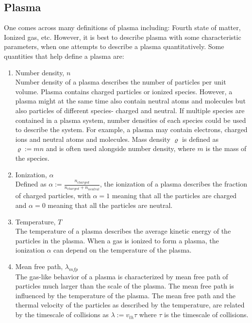 \documentclass[12pt]{article}
\begin{document}
	\subsection{Plasma}
	One comes across many definitions of plasma including: Fourth state of matter, Ionized gas, etc. However, it is best to describe plasma with some characteristic parameters, when one attempts to describe a plasma quantitatively. Some quantities that help define a plasma are:
	\begin{enumerate}
		\item Number density, $n$ \\
		Number density of a plasma describes the number of particles per unit volume. Plasma contains charged particles or ionized species. However, a plasma might at the same time also contain neutral atoms and molecules but also particles of different species- charged and neutral. If multiple species are contained in a plasma system, number densities of each species could be used to describe the system. For example, a plasma may contain electrons, charged ions and neutral atoms and molecules. Mass density $\varrho$ is defined as $\varrho := m n$ and is often used alongside number density, where $m$ is the mass of the species.
		
		\item Ionization, $\alpha$ \\
		Defined as $\alpha := \frac{\displaystyle n_{charged}}{\displaystyle n_{charged} + n_{neutral}}$, the ionization of a plasma describes the fraction of charged particles, with $\alpha = 1$ meaning that all the particles are charged and $\alpha = 0$ meaning that all the particles are neutral.
		
		\item Temperature, $T$ \\
		The temperature of a plasma describes the average kinetic energy of the particles in the plasma. When a gas is ionized to form a plasma, the ionization $\alpha$ can depend on the temperature of the plasma.
		
		\item Mean free path, $\lambda_{mfp}$ \\
		The gas-like behavior of a plasma is characterized by mean free path of particles much larger than the scale of the plasma. The mean free path is influenced by the temperature of the plasma. The mean free path and the thermal velocity of the particles as described by the temperature, are related by the timescale of collisions as $\lambda := v_{th} \tau$ where $\tau$ is the timescale of collisions. 
		

\end{enumerate}
\end{document}
